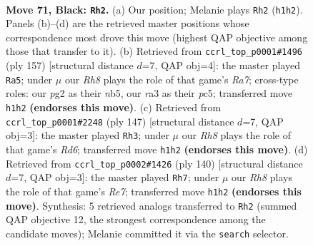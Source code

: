 \documentclass[11pt]{article}
\begin{document}
\clearpage

\begin{figure}[p]\centering
\begin{subfigure}{0.46\textwidth}\centering
\resizebox{\linewidth}{!}{%
\newchessgame
\chessboard[
  setfen={8/8/8/1k6/8/R2NK3/6P1/7r b - - 7 71},
  showmover=false,
  pgfstyle=straightmove, color=movearrow, markmove={h1-h2}
]}
\caption{}
\end{subfigure}\hfill
\begin{subfigure}{0.46\textwidth}\centering
\resizebox{\linewidth}{!}{%
\newchessgame
\chessboard[
  setfen={8/8/5k2/1NP5/5N2/4K3/r7/8 b - - 0 79},
  showmover=false,
  pgfstyle=straightmove, color=movearrow, markmove={a2-a5}
]}
\caption{}
\end{subfigure}
\\[4pt]
\begin{subfigure}{0.46\textwidth}\centering
\resizebox{\linewidth}{!}{%
\newchessgame
\chessboard[
  setfen={8/8/1k2K3/5N2/1p6/3r4/2R5/8 b - - 6 74},
  showmover=false,
  pgfstyle=straightmove, color=movearrow, markmove={d3-h3}
]}
\caption{}
\end{subfigure}\hfill
\begin{subfigure}{0.46\textwidth}\centering
\resizebox{\linewidth}{!}{%
\newchessgame
\chessboard[
  setfen={5r2/4R3/8/2n5/3k4/P7/8/6K1 w - - 6 71},
  showmover=false,
  pgfstyle=straightmove, color=movearrow, markmove={e7-h7}
]}
\caption{}
\end{subfigure}
\caption{\textbf{Move 71, Black: \texttt{Rh2}.} (a) Our position; Melanie plays \texttt{Rh2} (\texttt{h1h2}). Panels (b)--(d) are the retrieved master positions whose correspondence most drove this move (highest QAP objective among those that transfer to it). (b) Retrieved from \texttt{ccrl\_top\_p0001\#1496} (ply 157) [structural distance $d$=7, QAP obj=4]: the master played \texttt{Ra5}; under $\mu$ our \emph{Rh8} plays the role of that game's \emph{Ra7}; cross-type roles: our \emph{p}g2 as their \emph{n}b5, our \emph{r}a3 as their \emph{p}c5; transferred move \texttt{h1h2} \textbf{(endorses this move)}. (c) Retrieved from \texttt{ccrl\_top\_p0001\#2248} (ply 147) [structural distance $d$=7, QAP obj=3]: the master played \texttt{Rh3}; under $\mu$ our \emph{Rh8} plays the role of that game's \emph{Rd6}; transferred move \texttt{h1h2} \textbf{(endorses this move)}. (d) Retrieved from \texttt{ccrl\_top\_p0002\#1426} (ply 140) [structural distance $d$=7, QAP obj=3]: the master played \texttt{Rh7}; under $\mu$ our \emph{Rh8} plays the role of that game's \emph{Re7}; transferred move \texttt{h1h2} \textbf{(endorses this move)}. Synthesis: 5 retrieved analogs transferred to \texttt{Rh2} (summed QAP objective 12, the strongest correspondence among the candidate moves); Melanie committed it via the \texttt{search} selector.}
\label{fig:thought-m141}
\end{figure}
\end{document}
